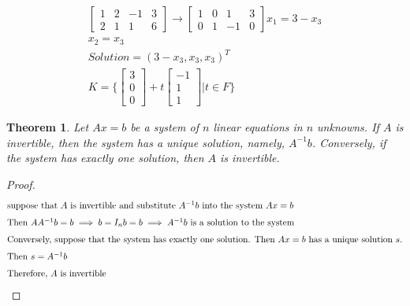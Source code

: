 \documentclass[10pt, oneside]{article}
\newtheorem{thm}{Theorem}
\begin{document}
\[
	\begin{split}
		\begin{bmatrix} 1 & 2 & -1 & 3 \\ 2 & 1 & 1 & 6 \end{bmatrix} \rightarrow \begin{bmatrix} 1 & 0 & 1 & 3 \\ 0 & 1 & -1 & 0 \end{bmatrix}
		x_1 = 3 - x_3 \\
		x_2 = x_3 \\
		Solution = (3 - x_3, x_3, x_3)^T \\
		K = \{ \begin{bmatrix} 3 \\ 0 \\ 0 \end{bmatrix} + t \begin{bmatrix} -1 \\ 1 \\ 1 \end{bmatrix} | t \in F \}
	\end{split}
\]

\begin{thm}
	Let $Ax = b$ be a system of $n$ linear equations in $n$ unknowns. If $A$ is invertible, then the system has a unique solution, namely, $A^{-1}b$. Conversely, if the system has exactly one solution, then $A$ is
	invertible.
\end{thm}

\begin{proof}
	\begin{align*}
		\intertext{suppose that $A$ is invertible and substitute $A^{-1}b$ into the system $Ax = b$}
		\intertext{Then $AA^{-1}b = b \implies b = I_n b = b \implies A^{-1}b \text{ is a solution to the system}$}
		\intertext{Conversely, suppose that the system has exactly one solution. Then $Ax = b$ has a unique solution $s$.}
		\intertext{Then $s = A^{-1}b$}
		\intertext{Therefore, $A$ is invertible}
	\end{align*}
\end{proof}
\end{document}
